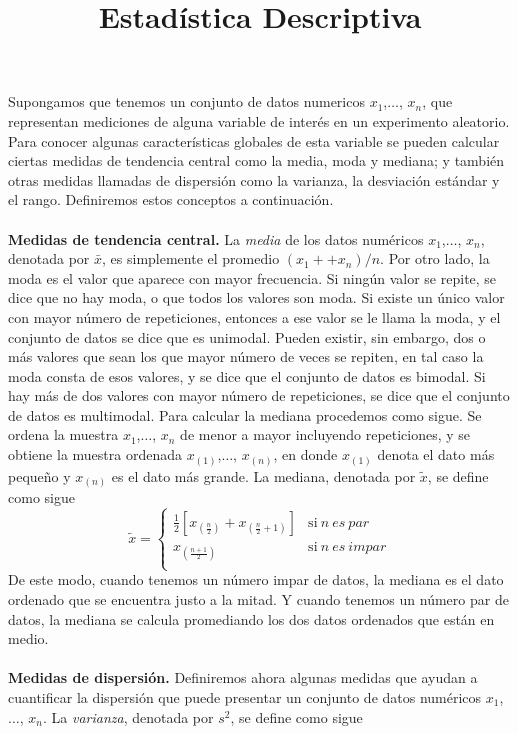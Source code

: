 \documentclass{report}
\title{Estadística Descriptiva}
\begin{document}
\maketitle

Supongamos que tenemos un conjunto de datos numericos $x_1$,$\ldots$, $x_n$, que
representan mediciones de alguna variable de interés en un experimento aleatorio.
Para conocer algunas características globales de esta variable se pueden
calcular ciertas medidas de tendencia central como la media, moda y mediana;
y también otras medidas llamadas de dispersión como la varianza, la desviación
estándar y el rango. Definiremos estos conceptos a continuación.\\\\
\textbf{Medidas de tendencia central.} La  \textit{media} de los datos numéricos $x_1$,$\ldots$, $x_n$, denotada por $\bar{x}$, es simplemente el promedio $(x_1 +  +x_n)/n$. Por otro lado, la
moda es el valor que aparece con mayor frecuencia. Si ningún valor se repite, se
dice que no hay moda, o que todos los valores son moda. Si existe un único valor
con mayor número de repeticiones, entonces a ese valor se le llama la moda, y el
conjunto de datos se dice que es unimodal. Pueden existir, sin embargo, dos o más
valores que sean los que mayor número de veces se repiten, en tal caso la moda
consta de esos valores, y se dice que el conjunto de datos es bimodal. Si hay
más de dos valores con mayor número de repeticiones, se dice que el conjunto
de datos es multimodal. Para calcular la mediana procedemos como sigue. Se
ordena la muestra $x_1$,$\ldots$, $x_n$ de menor a mayor incluyendo repeticiones, y se
obtiene la muestra ordenada $x_{(1)}$,$\ldots$, $x_{(n)}$, en donde $x_{(1)}$ denota el dato más
pequeño y $x_{(n)}$ es el dato más grande. La mediana, denotada por $\tilde{x}$, se define
como sigue\\
\begin{equation*}
     \tilde{x} = \left\{
	       \begin{array}{ll}
		 \frac{1}{2} [x_{(\frac{n}{2})} + x_{(\frac{n}{2} + 1)}]      & \mathrm{si\ } \textit{n} \ es \ par \\
		 x_{(\frac{n + 1}{2})} & \mathrm{si\ } \textit{n} \ es \ impar \\
	       \end{array}
	     \right.
   \end{equation*}
  De este modo, cuando tenemos un número impar de datos, la mediana es el
dato ordenado que se encuentra justo a la mitad. Y cuando tenemos un número
par de datos, la mediana se calcula promediando los dos datos ordenados que
están en medio.\\\\
\textbf{Medidas de dispersión.} Definiremos ahora algunas medidas que ayudan a
cuantificar la dispersión que puede presentar un conjunto de datos numéricos
$x_1$,$\ldots$, $x_n$. La \textit{varianza}, denotada por $s^2$, se define como sigue\\
\end{document}
